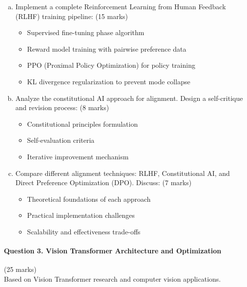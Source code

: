 \documentclass[12pt]{article}
\newcommand{\mediumanswer}{\vspace{3cm}}
\newcommand{\codespace}{\vspace{5cm}}
\begin{document}
\begin{enumerate}[(a)]
    \item Implement a complete Reinforcement Learning from Human Feedback (RLHF) training pipeline: \hfill (15 marks)
    \begin{itemize}
        \item Supervised fine-tuning phase algorithm
        \item Reward model training with pairwise preference data
        \item PPO (Proximal Policy Optimization) for policy training
        \item KL divergence regularization to prevent mode collapse
    \end{itemize}
    
    \codespace
    
    \item Analyze the constitutional AI approach for alignment. Design a self-critique and revision process: \hfill (8 marks)
    \begin{itemize}
        \item Constitutional principles formulation
        \item Self-evaluation criteria
        \item Iterative improvement mechanism
    \end{itemize}
    
    \mediumanswer
    
    \item Compare different alignment techniques: RLHF, Constitutional AI, and Direct Preference Optimization (DPO). Discuss: \hfill (7 marks)
    \begin{itemize}
        \item Theoretical foundations of each approach
        \item Practical implementation challenges
        \item Scalability and effectiveness trade-offs
    \end{itemize}
    
    \mediumanswer
\end{enumerate}

\newpage
\paragraph{Question 3. Vision Transformer Architecture and Optimization}\hfill (25 marks)\\
Based on Vision Transformer research and computer vision applications.
\end{document}
